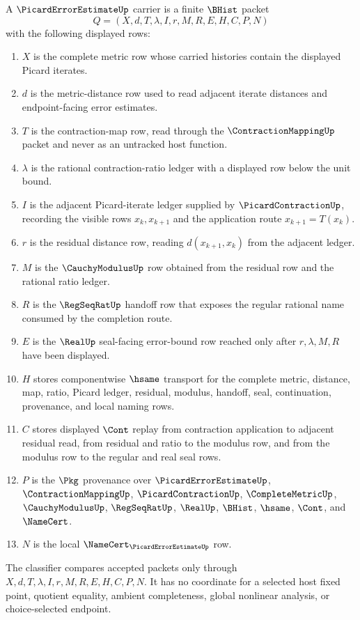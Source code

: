 \begin{definition}\label{def:picard-error-estimate-carrier}
A $\PicardErrorEstimateUp$ carrier is a finite $\BHist$ packet
$$
Q=(X,d,T,\lambda,I,r,M,R,E,H,C,P,N)
$$
with the following displayed rows:
\begin{enumerate}
\item $X$ is the complete metric row whose carried histories contain the displayed Picard iterates.
\item $d$ is the metric-distance row used to read adjacent iterate distances and endpoint-facing error estimates.
\item $T$ is the contraction-map row, read through the $\ContractionMappingUp$ packet and never as an untracked host function.
\item $\lambda$ is the rational contraction-ratio ledger with a displayed row below the unit bound.
\item $I$ is the adjacent Picard-iterate ledger supplied by $\PicardContractionUp$, recording the visible rows $x_k,x_{k+1}$ and the application route $x_{k+1}=T(x_k)$.
\item $r$ is the residual distance row, reading $d(x_{k+1},x_k)$ from the adjacent ledger.
\item $M$ is the $\CauchyModulusUp$ row obtained from the residual row and the rational ratio ledger.
\item $R$ is the $\RegSeqRatUp$ handoff row that exposes the regular rational name consumed by the completion route.
\item $E$ is the $\RealUp$ seal-facing error-bound row reached only after $r,\lambda,M,R$ have been displayed.
\item $H$ stores componentwise $\hsame$ transport for the complete metric, distance, map, ratio, Picard ledger, residual, modulus, handoff, seal, continuation, provenance, and local naming rows.
\item $C$ stores displayed $\Cont$ replay from contraction application to adjacent residual read, from residual and ratio to the modulus row, and from the modulus row to the regular and real seal rows.
\item $P$ is the $\Pkg$ provenance over $\PicardErrorEstimateUp$, $\ContractionMappingUp$, $\PicardContractionUp$, $\CompleteMetricUp$, $\CauchyModulusUp$, $\RegSeqRatUp$, $\RealUp$, $\BHist$, $\hsame$, $\Cont$, and $\NameCert$.
\item $N$ is the local $\NameCert_{\PicardErrorEstimateUp}$ row.
\end{enumerate}
The classifier compares accepted packets only through $X,d,T,\lambda,I,r,M,R,E,H,C,P,N$. It has no coordinate for a selected host fixed point, quotient equality, ambient completeness, global nonlinear analysis, or choice-selected endpoint.
\end{definition}

